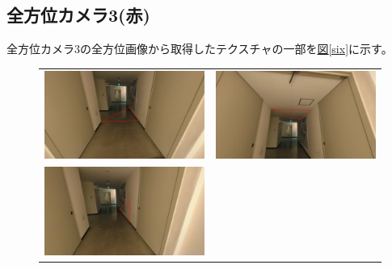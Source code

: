 \documentclass[]{jarticle}          %
\begin{document}
\subsection{全方位カメラ3(赤)}
全方位カメラ3の全方位画像から取得したテクスチャの一部を\hyperref[six]{図\ref{six}}に示す。
\begin{figure}[H]
  \begin{center}
    \begin{tabular}{cc}
      \includegraphics[keepaspectratio, scale=0.08]{figures/texture2/texture_2_0.png}&
      \includegraphics[keepaspectratio, scale=0.08]{figures/texture2/texture_2_5.png}\\
      \includegraphics[keepaspectratio, scale=0.08]{figures/texture2/texture_2_10.png}&

\end{tabular}
\end{center}
\end{figure}
\end{document}
